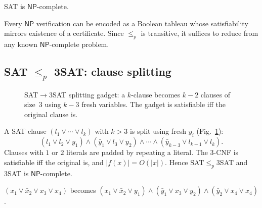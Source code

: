 \begin{theorem}
\textsc{SAT} is $\mathsf{NP}$-complete.
\end{theorem}
Every $\mathsf{NP}$ verification can be encoded as a Boolean tableau whose satisfiability mirrors existence of a certificate. Since $\le_p$ is transitive, it suffices to reduce from any known $\mathsf{NP}$-complete problem.

\subsection{\texorpdfstring{SAT $\le_p$ 3SAT}{SAT <=p 3SAT}: clause splitting}
\begin{figure}[h]\centering
{}
\caption{SAT$\to$3SAT splitting gadget: a $k$-clause becomes $k{-}2$ clauses of size~3 using $k{-}3$ fresh variables. The gadget is satisfiable iff the original clause is.}
\label{fig:sat-3sat-gadget}
\end{figure}
A \textsc{SAT} clause $(l_1\vee\cdots\vee l_k)$ with $k>3$ is split using fresh $y_i$ (Fig.~\ref{fig:sat-3sat-gadget}):
\[
(l_1\vee l_2\vee y_1)\wedge(\bar y_1\vee l_3\vee y_2)\wedge\cdots\wedge(\bar y_{k-3}\vee l_{k-1}\vee l_k).
\]
Clauses with $1$ or $2$ literals are padded by repeating a literal. The 3-CNF is satisfiable iff the original is, and $|f(x)|=O(|x|)$. Hence SAT$\le_p$3SAT and \textsc{3SAT} is $\mathsf{NP}$-complete.

\begin{example}
$(x_1\vee\bar x_2\vee x_3\vee x_4)$ becomes $(x_1\vee\bar x_2\vee y_1)\wedge(\bar y_1\vee x_3\vee y_2)\wedge(\bar y_2\vee x_4\vee x_4)$.
\end{example}

